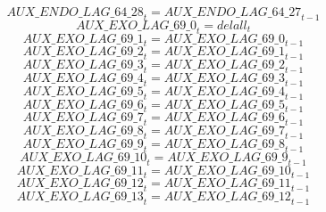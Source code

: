 \begin{dmath}
{AUX\_ENDO\_LAG\_64\_28}_{t}={AUX\_ENDO\_LAG\_64\_27}_{t-1}
\end{dmath}
\begin{dmath}
{AUX\_EXO\_LAG\_69\_0}_{t}={delall}_{t}
\end{dmath}
\begin{dmath}
{AUX\_EXO\_LAG\_69\_1}_{t}={AUX\_EXO\_LAG\_69\_0}_{t-1}
\end{dmath}
\begin{dmath}
{AUX\_EXO\_LAG\_69\_2}_{t}={AUX\_EXO\_LAG\_69\_1}_{t-1}
\end{dmath}
\begin{dmath}
{AUX\_EXO\_LAG\_69\_3}_{t}={AUX\_EXO\_LAG\_69\_2}_{t-1}
\end{dmath}
\begin{dmath}
{AUX\_EXO\_LAG\_69\_4}_{t}={AUX\_EXO\_LAG\_69\_3}_{t-1}
\end{dmath}
\begin{dmath}
{AUX\_EXO\_LAG\_69\_5}_{t}={AUX\_EXO\_LAG\_69\_4}_{t-1}
\end{dmath}
\begin{dmath}
{AUX\_EXO\_LAG\_69\_6}_{t}={AUX\_EXO\_LAG\_69\_5}_{t-1}
\end{dmath}
\begin{dmath}
{AUX\_EXO\_LAG\_69\_7}_{t}={AUX\_EXO\_LAG\_69\_6}_{t-1}
\end{dmath}
\begin{dmath}
{AUX\_EXO\_LAG\_69\_8}_{t}={AUX\_EXO\_LAG\_69\_7}_{t-1}
\end{dmath}
\begin{dmath}
{AUX\_EXO\_LAG\_69\_9}_{t}={AUX\_EXO\_LAG\_69\_8}_{t-1}
\end{dmath}
\begin{dmath}
{AUX\_EXO\_LAG\_69\_10}_{t}={AUX\_EXO\_LAG\_69\_9}_{t-1}
\end{dmath}
\begin{dmath}
{AUX\_EXO\_LAG\_69\_11}_{t}={AUX\_EXO\_LAG\_69\_10}_{t-1}
\end{dmath}
\begin{dmath}
{AUX\_EXO\_LAG\_69\_12}_{t}={AUX\_EXO\_LAG\_69\_11}_{t-1}
\end{dmath}
\begin{dmath}
{AUX\_EXO\_LAG\_69\_13}_{t}={AUX\_EXO\_LAG\_69\_12}_{t-1}
\end{dmath}
